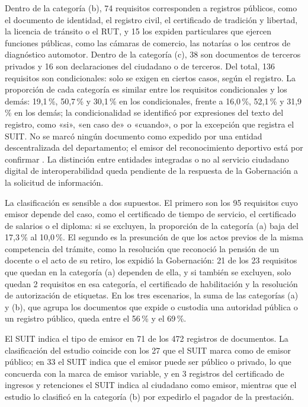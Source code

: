 Dentro de la categoría (b), 74 requisitos corresponden a registros públicos, como el documento de identidad, el registro civil, el certificado de tradición y libertad, la licencia de tránsito o el RUT, y 15 los expiden particulares que ejercen funciones públicas, como las cámaras de comercio, las notarías o los centros de diagnóstico automotor.  Dentro de la categoría (c), 38 son documentos de terceros privados y 16 son declaraciones del ciudadano o de terceros. Del total, 136 requisitos son condicionales: solo se exigen en ciertos casos, según el registro. La proporción de cada categoría es similar entre los requisitos condicionales y los demás: 19,1\,\%, 50,7\,\% y 30,1\,\% en los condicionales, frente a 16,0\,\%, 52,1\,\% y 31,9\,\% en los demás; la condicionalidad se identificó por expresiones del texto del registro, como «si», «en caso de» o «cuando», o por la excepción que registra el SUIT. No se marcó ningún documento como expedido por una entidad descentralizada del departamento; el emisor del reconocimiento deportivo está por confirmar . La distinción entre entidades integradas o no al servicio ciudadano digital de interoperabilidad queda pendiente de la respuesta de la Gobernación a la solicitud de información.

La clasificación es sensible a dos supuestos. El primero son los 95 requisitos cuyo emisor depende del caso, como el certificado de tiempo de servicio, el certificado de salarios o el diploma: si se excluyen, la proporción de la categoría (a) baja del 17,3\,\% al 10,0\,\%. El segundo es la presunción de que los actos previos de la misma competencia del trámite, como la resolución que reconoció la pensión de un docente o el acto de su retiro, los expidió la Gobernación: 21 de los 23 requisitos que quedan en la categoría (a) dependen de ella, y si también se excluyen, solo quedan 2 requisitos en esa categoría, el certificado de habilitación y la resolución de autorización de etiquetas. En los tres escenarios, la suma de las categorías (a) y (b), que agrupa los documentos que expide o custodia una autoridad pública o un registro público, queda entre el 56\,\% y el 69\,\%.

El SUIT indica el tipo de emisor en 71 de los 472 registros de documentos. La clasificación del estudio coincide con los 27 que el SUIT marca como de emisor público; en 33 el SUIT indica que el emisor puede ser público o privado, lo que concuerda con la marca de emisor variable, y en 3 registros del certificado de ingresos y retenciones el SUIT indica al ciudadano como emisor, mientras que el estudio lo clasificó en la categoría (b) por expedirlo el pagador de la prestación.

